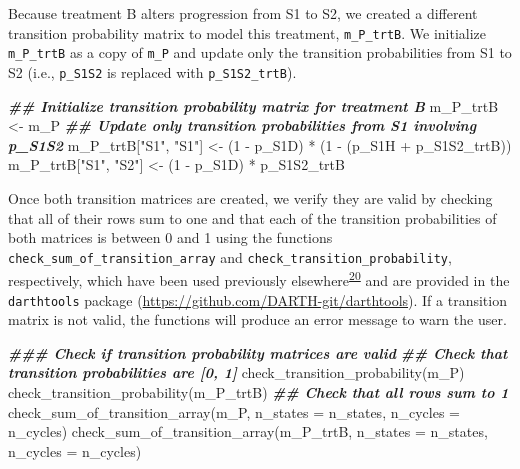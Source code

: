 \documentclass[
]{article}
\newenvironment{Shaded}{\begin{snugshade}}{\end{snugshade}}
\newcommand{\AttributeTok}[1]{\textcolor[rgb]{0.77,0.63,0.00}{#1}}
\newcommand{\DecValTok}[1]{\textcolor[rgb]{0.00,0.00,0.81}{#1}}
\newcommand{\DocumentationTok}[1]{\textcolor[rgb]{0.56,0.35,0.01}{\textbf{\textit{#1}}}}
\newcommand{\FunctionTok}[1]{\textcolor[rgb]{0.00,0.00,0.00}{#1}}
\newcommand{\NormalTok}[1]{#1}
\newcommand{\OtherTok}[1]{\textcolor[rgb]{0.56,0.35,0.01}{#1}}
\newcommand{\SpecialCharTok}[1]{\textcolor[rgb]{0.00,0.00,0.00}{#1}}
\newcommand{\StringTok}[1]{\textcolor[rgb]{0.31,0.60,0.02}{#1}}
\begin{document}
Because treatment B alters progression from S1 to S2, we created a different transition probability matrix to model this treatment, \texttt{m\_P\_trtB}. We initialize \texttt{m\_P\_trtB} as a copy of \texttt{m\_P} and update only the transition probabilities from S1 to S2 (i.e., \texttt{p\_S1S2} is replaced with \texttt{p\_S1S2\_trtB}).

\begin{Shaded}
\begin{Highlighting}[]
\DocumentationTok{\#\# Initialize transition probability matrix for treatment B}
\NormalTok{m\_P\_trtB }\OtherTok{\textless{}{-}}\NormalTok{ m\_P}
\DocumentationTok{\#\# Update only transition probabilities from S1 involving p\_S1S2}
\NormalTok{m\_P\_trtB[}\StringTok{"S1"}\NormalTok{, }\StringTok{"S1"}\NormalTok{] }\OtherTok{\textless{}{-}}\NormalTok{ (}\DecValTok{1} \SpecialCharTok{{-}}\NormalTok{ p\_S1D) }\SpecialCharTok{*}\NormalTok{ (}\DecValTok{1} \SpecialCharTok{{-}}\NormalTok{ (p\_S1H }\SpecialCharTok{+}\NormalTok{ p\_S1S2\_trtB))}
\NormalTok{m\_P\_trtB[}\StringTok{"S1"}\NormalTok{, }\StringTok{"S2"}\NormalTok{] }\OtherTok{\textless{}{-}}\NormalTok{ (}\DecValTok{1} \SpecialCharTok{{-}}\NormalTok{ p\_S1D) }\SpecialCharTok{*}\NormalTok{ p\_S1S2\_trtB}
\end{Highlighting}
\end{Shaded}

Once both transition matrices are created, we verify they are valid by checking that all of their rows sum to one and that each of the transition probabilities of both matrices is between 0 and 1 using the functions \texttt{check\_sum\_of\_transition\_array} and \texttt{check\_transition\_probability}, respectively, which have been used previously elsewhere\textsuperscript{\protect\hyperlink{ref-Alarid-Escudero2019e}{20}} and are provided in the \texttt{darthtools} package (\url{https://github.com/DARTH-git/darthtools}). If a transition matrix is not valid, the functions will produce an error message to warn the user.

\begin{Shaded}
\begin{Highlighting}[]
\DocumentationTok{\#\#\# Check if transition probability matrices are valid}
\DocumentationTok{\#\# Check that transition probabilities are [0, 1]}
\FunctionTok{check\_transition\_probability}\NormalTok{(m\_P)}
\FunctionTok{check\_transition\_probability}\NormalTok{(m\_P\_trtB)}
\DocumentationTok{\#\# Check that all rows sum to 1}
\FunctionTok{check\_sum\_of\_transition\_array}\NormalTok{(m\_P,      }\AttributeTok{n\_states =}\NormalTok{ n\_states, }\AttributeTok{n\_cycles =}\NormalTok{ n\_cycles)}
\FunctionTok{check\_sum\_of\_transition\_array}\NormalTok{(m\_P\_trtB, }\AttributeTok{n\_states =}\NormalTok{ n\_states, }\AttributeTok{n\_cycles =}\NormalTok{ n\_cycles)}
\end{Highlighting}
\end{Shaded}
\end{document}

